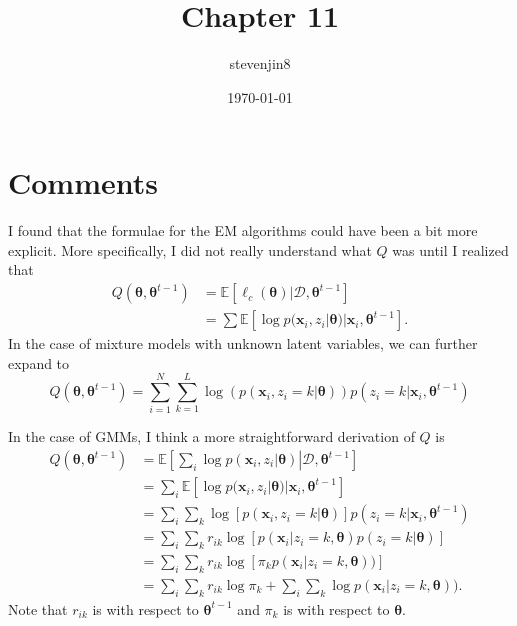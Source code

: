 \documentclass[a4paper,11pt]{article}
\title{Chapter 11}
\author{stevenjin8}
\date{\today}
\begin{document}
\maketitle

\section*{Comments}

I found that the formulae for the EM algorithms could have been a bit more explicit. More specifically, I did not really understand what $Q$ was until I realized that
\begin{align*}
    Q(\boldsymbol{\theta}, \boldsymbol{\theta}^{t-1})
    &= \mathbb{E}[\ell_c(\boldsymbol{\theta})|\mathcal{D}, \boldsymbol{\theta}^{t-1}] \\
    &= \sum \mathbb{E}[\log p(\mathbf{x}_i, z_i|\boldsymbol{\theta})
    | \mathbf{x}_i, \boldsymbol{\theta}^{t-1}].
\end{align*}
In the case of mixture models with unknown latent variables, we can further expand to
\[
    Q(\boldsymbol{\theta}, \boldsymbol{\theta}^{t-1}) = \sum\limits_{i=1}^N\sum\limits_{k=1}^L
    \log(p(\mathbf{x}_i, z_i=k| \boldsymbol{\theta}))
    p(z_i=k|\mathbf{x}_i, \boldsymbol{\theta}^{t-1})
\]

In the case of GMMs, I think a more straightforward derivation of $Q$ is
\begin{align*}
    Q(\boldsymbol{\theta}, \mathbf{\theta}^{t-1})
    &= \mathbb{E}\left[\left.\sum\limits_i\log
    p(\mathbf{x}_i, z_i| \boldsymbol{\theta})\right|
    \mathcal{D}, \boldsymbol{\theta}^{t-1}\right] \\
    &= \sum\limits_i\mathbb{E}\left[\log
    p(\mathbf{x}_i, z_i| \boldsymbol{\theta})|
    \mathbf{x}_i, \boldsymbol{\theta}^{t-1}\right] \\
    &= \sum\limits_i\sum\limits_k \log[p(\mathbf{x}_i, z_i=k | \boldsymbol{\theta})]
    p(z_i=k|\mathbf{x}_i, \boldsymbol{\theta}^{t-1}) \\
    &= \sum\limits_i\sum\limits_k
    r_{ik}\log[p(\mathbf{x}_i|z_i=k, \boldsymbol{\theta})p(z_i=k|\boldsymbol{\theta})] \\
    &= \sum\limits_i\sum\limits_k
    r_{ik}\log[\pi_k p(\mathbf{x}_i|z_i=k, \boldsymbol{\theta}))] \\
    &= \sum\limits_i\sum\limits_k r_{ik}\log\pi_k + 
     \sum\limits_i\sum\limits_k \log p(\mathbf{x}_i|z_i=k, \boldsymbol{\theta})).
\end{align*}
Note that $r_{ik}$ is with respect to $\boldsymbol{\theta}^{t-1}$ and $\pi_k$ is with respect to
$\boldsymbol{\theta}$.
\end{document}
